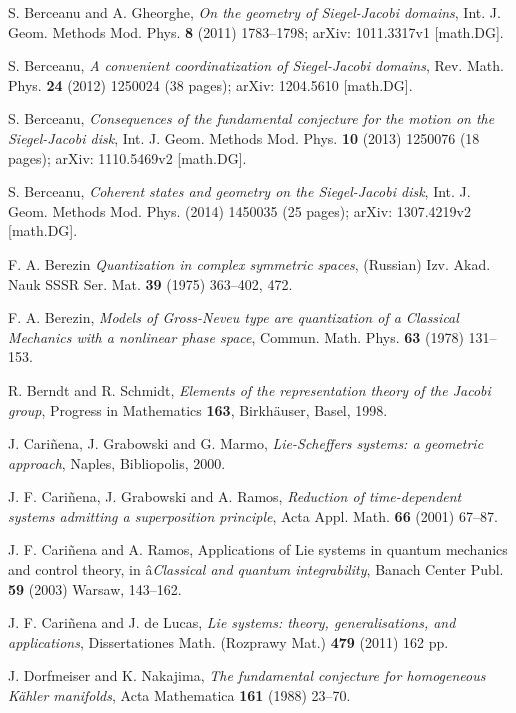 \documentclass[12pt]{amsart}
\numberwithin{equation}{section}
\theoremstyle{definition}
\begin{document}
\begin{thebibliography}{99}
S. Berceanu and  A. Gheorghe, {\it On the geometry of Siegel-Jacobi domains},
 Int. J. Geom. Methods Mod. Phys. {\bf 8}  (2011) 1783--1798;  arXiv:
 1011.3317v1 [math.DG]. 

S. Berceanu,  {\it A convenient coordinatization of Siegel-Jacobi
    domains},   Rev.  Math. Phys.  {\bf 24}  (2012) 1250024 (38 pages);
  arXiv: 1204.5610 [math.DG]. 

 S. Berceanu,  {\it Consequences of the fundamental conjecture for the motion
  on the  Siegel-Jacobi disk},   Int.  J.  Geom. Methods Mod. Phys. {\bf
  10} (2013) 1250076 (18 pages);   arXiv: 1110.5469v2  [math.DG]. 

  S. Berceanu, {\it Coherent states and geometry on the Siegel-Jacobi
disk},  Int.  J. Geom. Methods Mod. Phys. (2014) 1450035 (25 pages);
arXiv: 1307.4219v2 [math.DG].

F. A. 
 Berezin    {\it Quantization in complex symmetric spaces}, (Russian)
 Izv. Akad. Nauk SSSR Ser. Mat.     {\bf 39}  (1975) 363--402, 472. 
  

 F. A. Berezin,  {\it Models of Gross-Neveu type are
  quantization of a Classical Mechanics with a nonlinear phase space},
 Commun. Math. Phys.  {\bf 63}  (1978) 131--153.

R. Berndt and  R.  Schmidt, {\it  Elements of the representation
theory of the Jacobi group}, Progress in Mathematics {\bf 163}, 
Birkh\"auser, Basel, 1998. 

 J. Cari\~{n}ena,  J. Grabowski and  G. Marmo, {\it  Lie-Scheffers
  systems: a geometric approach}, Naples, Bibliopolis, 2000. 

 J. F.  Cari\~{n}ena,  J. Grabowski and  A. Ramos, {\it Reduction of time-dependent systems
admitting a superposition principle}, Acta Appl. Math. {\bf 66}
(2001) 67--87.

 J. F. Cari\~{n}ena and  A. Ramos, Applications of Lie systems in quantum mechanics and control theory, in
â{\it Classical and quantum integrability}, Banach Center Publ. {\bf
  59} (2003)  Warsaw,
 143--162. 

 J. F. Cari\~{n}ena and J. de Lucas, {\it Lie systems: theory, generalisations, and applications}, Dissertationes
Math. (Rozprawy Mat.) {\bf 479}  (2011) 162 pp. 

J. Dorfmeiser and  K. Nakajima, {\it The fundamental
    conjecture for homogeneous K\"ahler manifolds}, Acta Mathematica 
  {\bf 161} (1988) 23--70.


\end{thebibliography}
\end{document}
